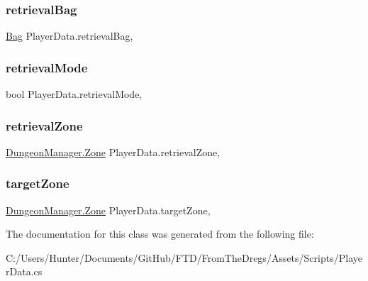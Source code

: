 \subsubsection{\texorpdfstring{retrievalBag}{retrievalBag}}
{\footnotesize\ttfamily \mbox{\hyperlink{class_bag}{Bag}} Player\+Data.\+retrieval\+Bag\hspace{0.3cm}{\ttfamily [get]}, {\ttfamily [set]}}

\mbox{\label{class_player_data_ae258f6bda605a5d3c9d4d701af4bf4d4}} 
\subsubsection{\texorpdfstring{retrievalMode}{retrievalMode}}
{\footnotesize\ttfamily bool Player\+Data.\+retrieval\+Mode\hspace{0.3cm}{\ttfamily [get]}, {\ttfamily [set]}}

\mbox{\label{class_player_data_aed5e24eed1db76e3d8954ab05e8f342c}} 
\subsubsection{\texorpdfstring{retrievalZone}{retrievalZone}}
{\footnotesize\ttfamily \mbox{\hyperlink{class_dungeon_manager_a6558d4a01889674bf25c798f1b90a431}{Dungeon\+Manager.\+Zone}} Player\+Data.\+retrieval\+Zone\hspace{0.3cm}{\ttfamily [get]}, {\ttfamily [set]}}

\mbox{\label{class_player_data_a5671b8f488e96c5263bb062200ae781a}} 
\subsubsection{\texorpdfstring{targetZone}{targetZone}}
{\footnotesize\ttfamily \mbox{\hyperlink{class_dungeon_manager_a6558d4a01889674bf25c798f1b90a431}{Dungeon\+Manager.\+Zone}} Player\+Data.\+target\+Zone\hspace{0.3cm}{\ttfamily [get]}, {\ttfamily [set]}}



The documentation for this class was generated from the following file\+:\begin{DoxyCompactItemize}
\item 
C\+:/\+Users/\+Hunter/\+Documents/\+Git\+Hub/\+F\+T\+D/\+From\+The\+Dregs/\+Assets/\+Scripts/Player\+Data.\+cs\end{DoxyCompactItemize}
